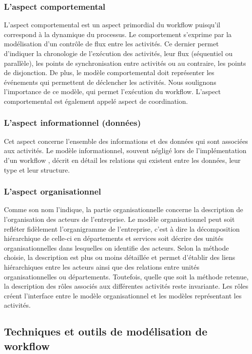 \subsubsection{L'aspect comportemental}
L'aspect comportemental est un aspect primordial du workflow puisqu'il correspond à la dynamique du processus. Le comportement s'exprime par la modélisation d'un contrôle de flux entre les activités. Ce dernier permet d'indiquer la chronologie de l'exécution des activités, leur flux (séquentiel ou parallèle), les points de synchronisation entre activités ou au contraire, les points de disjonction. De plus, le modèle comportemental doit représenter les événements qui permettent de déclencher les activités. Nous soulignons l'importance de ce modèle, qui permet l'exécution du workflow. L'aspect comportemental est également appelé aspect de coordination.
\subsubsection{ L'aspect informationnel (données) }
Cet aspect concerne l'ensemble des informations et des données qui sont associées
aux activités. Le modèle informationnel, souvent négligé lors de l'implémentation d'un workflow \parencite{b3}, décrit en détail les relations qui existent entre les données, leur type et leur structure.
\subsubsection{L'aspect organisationnel }
Comme son nom l'indique, la partie organisationnelle concerne la description de l'organisation des acteurs de l'entreprise. Le modèle organisationnel peut soit refléter fidèlement l'organigramme de l'entreprise, c'est à dire la décomposition hiérarchique de celle-ci en départements et services soit décrire des unités organisationnelles dans lesquelles on identifie des acteurs. Selon la méthode choisie, la description est plus ou moins détaillée et permet d'établir des liens hiérarchiques entre les acteurs ainsi que des relations entre unités organisationnelles ou départements. Toutefois, quelle que soit la méthode retenue, la description des rôles associés aux différentes activités reste invariante. Les rôles créent l'interface entre le modèle organisationnel et les modèles représentant les activités.

\subsection{Techniques et outils de modélisation de workflow}

